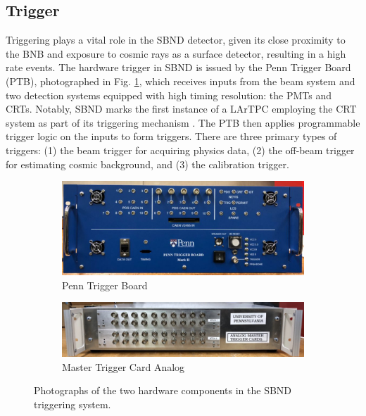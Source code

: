 \subsection{Trigger}

Triggering plays a vital role in the SBND detector, given its close proximity to the BNB and exposure to cosmic rays as a surface detector, resulting in a high rate events. 
The hardware trigger in SBND is issued by the Penn Trigger Board (PTB), photographed in Fig. \ref{fig:SBND_PTB_MTCA}, which receives inputs from the beam system and two detection systems equipped with high timing resolution: the PMTs and CRTs. 
Notably, SBND marks the first instance of a LArTPC employing the CRT system as part of its triggering mechanism \cite{CPAD2022}.
The PTB then applies programmable trigger logic on the inputs to form triggers.
There are three primary types of triggers: (1) the beam trigger for acquiring physics data, (2) the off-beam trigger for estimating cosmic background, and (3) the calibration trigger.

\begin{figure}[htbp!]
\begin{subfigure}[h]{0.5\linewidth}
\centering    
\includegraphics[width=\linewidth]{SBND_PTB}
\caption{Penn Trigger Board}
\end{subfigure}
\hfill
\begin{subfigure}[h]{0.5\linewidth}
\centering    
\includegraphics[width=\linewidth]{SBND_MTCA}
\caption{Master Trigger Card Analog}
\end{subfigure}%
\caption[SBND_PTB_MTCA]{
Photographs of the two hardware components in the SBND triggering system.
}\label{fig:SBND_PTB_MTCA}
\end{figure}

